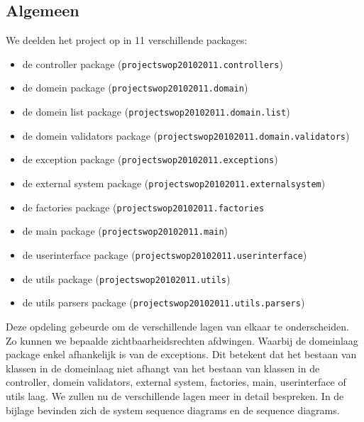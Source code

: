 \label{overzicht}
\subsection{Algemeen}
We deelden het project op in 11 verschillende packages:
\begin{itemize}
  \item de controller package (\texttt{projectswop20102011.controllers})
  \item de domein package (\texttt{projectswop20102011.domain})
  \item de domein list package (\texttt{projectswop20102011.domain.list})
  \item de domein validators package (\texttt{projectswop20102011.domain.validators})
  \item de exception package (\texttt{projectswop20102011.exceptions})
  \item de external system package (\texttt{projectswop20102011.externalsystem})
  \item de factories package (\texttt{projectswop20102011.factories}
  \item de main package (\texttt{projectswop20102011.main})
  \item de userinterface package (\texttt{projectswop20102011.userinterface})
  \item de utils package (\texttt{projectswop20102011.utils})
  \item de utils parsers package (\texttt{projectswop20102011.utils.parsers})
\end{itemize}
Deze opdeling gebeurde om de verschillende lagen van elkaar te onderscheiden. Zo kunnen we bepaalde zichtbaarheidsrechten afdwingen. Waarbij de domeinlaag package enkel afhankelijk is van de exceptions.
Dit betekent dat het bestaan van klassen in de domeinlaag niet afhangt van het bestaan van klassen in de controller, domein validators, external system, factories, main, userinterface of utils laag.
We zullen nu de verschillende lagen meer in detail bespreken. In de bijlage bevinden zich de system sequence diagrams en de sequence diagrams.
